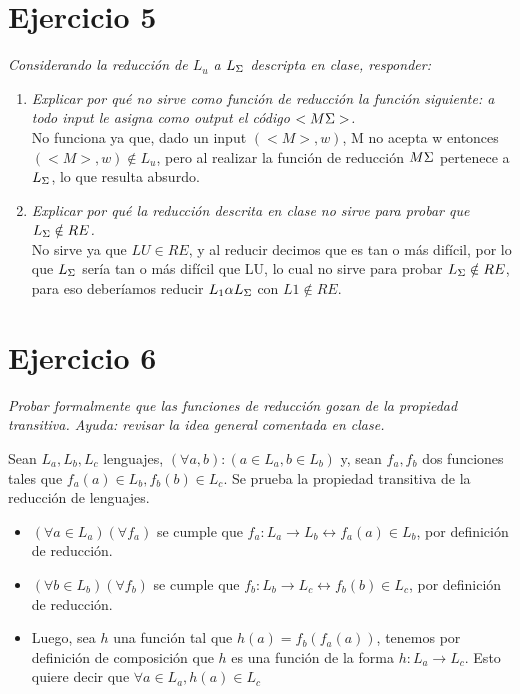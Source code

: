 \documentclass[lnbip]{svmultln}
\begin{document}
\section{Ejercicio 5}

\textit{Considerando la reducción de $L_u$ a $L_{\Sigma \*}$ descripta en clase, responder:} \\

\begin{enumerate}
    \item \textit{Explicar por qué no sirve como función de reducción la función siguiente: a todo input le asigna como output el código $<M \Sigma \*>$.} \\

    No funciona ya que, dado un input $(<M>,w)$, M no acepta w entonces $(<M>,w) \notin L_u$, pero al realizar la función de reducción $M \Sigma \*$ pertenece a $L_{\Sigma \*}$, lo que resulta absurdo. \\
    
    \item \textit{Explicar por qué la reducción descrita en clase no sirve para probar que $L_{\Sigma \*} \notin RE$.} \\
    
    No sirve ya que $LU \in RE$, y al reducir decimos que es tan o más difícil, por lo que $L_{\Sigma \*}$ sería tan o más difícil que LU, lo cual no sirve para probar $L_{\Sigma \*} \notin RE$, para eso deberíamos reducir $L_1 \alpha L_{\Sigma \*}$ con $L1 \notin RE$.
\end{enumerate}


\section{Ejercicio 6}

\textit{Probar formalmente que las funciones de reducción gozan de la propiedad transitiva. Ayuda: revisar la idea general comentada en clase.}

Sean $L_a, L_b, L_c$ lenguajes, $(\forall a, b) : (a \in L_{a}, b \in L_{b})$ y, sean $f_a, f_b$ dos funciones tales que $f_{a}(a) \in L_b, f_{b}(b) \in L_c$. Se prueba la propiedad transitiva de la reducción de lenguajes.

\begin{itemize}
    \item $(\forall a \in L_{a})(\forall f_a)$ se cumple que $f_a: L_a \rightarrow L_b \leftrightarrow f_a(a) \in L_b$, por definición de reducción.
    
    \item $(\forall b \in L_{b})(\forall f_b)$ se cumple que $f_b: L_b \rightarrow L_c \leftrightarrow f_b(b) \in L_c$, por definición de reducción.
    
    \item Luego, sea $h$ una función tal que $h(a) = f_{b}(f_{a}(a))$, tenemos por definición de composición que $h$ es una función de la forma $h: L_a \rightarrow L_c$. Esto quiere decir que $\forall a \in L_{a}, h(a) \in L_{c}$
\end{itemize}
\end{document}
